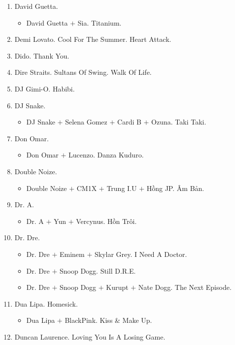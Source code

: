 \documentclass{article}
\begin{document}
\begin{enumerate}
	\item {\sc David Guetta.}
	\begin{itemize}
		\item {\sc David Guetta $+$ Sia.} Titanium.
	\end{itemize}
	\item {\sc Demi Lovato.} Cool For The Summer. Heart Attack.
	\item {\sc Dido.} Thank You.
	\item {\sc Dire Straits.} Sultans Of Swing. Walk Of Life.
	\item {\sc DJ Gimi-O.} Habibi.
	\item {\sc DJ Snake.}
	\begin{itemize}
		\item {\sc DJ Snake $+$ Selena Gomez $+$ Cardi B $+$ Ozuna.} Taki Taki.
	\end{itemize}
	\item {\sc Don Omar.}
	\begin{itemize}
		\item {\sc Don Omar $+$ Lucenzo.} Danza Kuduro.
	\end{itemize}
	\item {\sc Double Noize.}
	\begin{itemize}
		\item {\sc Double Noize $+$ CM1X $+$ Trung I.U $+$ Hồng JP.} Âm Bản.
	\end{itemize}
	\item {\sc Dr. A.}
	\begin{itemize}
		\item {\sc Dr. A $+$ Yun $+$ Vercynus.} Hồn Trôi.
	\end{itemize}
	\item {\sc Dr. Dre.}
	\begin{itemize}
		\item {\sc Dr. Dre $+$ Eminem $+$ Skylar Grey.} I Need A Doctor.
		\item {\sc Dr. Dre $+$ Snoop Dogg.} Still D.R.E.
		\item {\sc Dr. Dre $+$ Snoop Dogg $+$ Kurupt $+$ Nate Dogg.} The Next Episode.
	\end{itemize}
	\item {\sc Dua Lipa.} Homesick.
	\begin{itemize}
		\item {\sc Dua Lipa $+$ BlackPink.} Kiss \& Make Up.
	\end{itemize}
	\item {\sc Duncan Laurence.} Loving You Is A Losing Game.
	\begin{itemize}

\end{itemize}
\end{enumerate}
\end{document}
